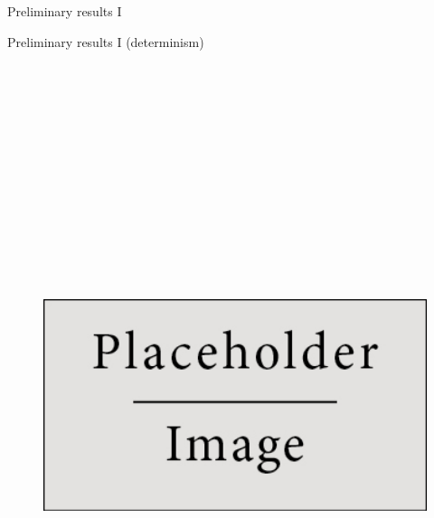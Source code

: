 \begin{block}{Preliminary results I}

  
\end{block}

\begin{block}{Preliminary results I (determinism)}

  \begin{figure}
    \includegraphics[height=20cm]{place_holder.png}

  \end{figure}


\end{block}
